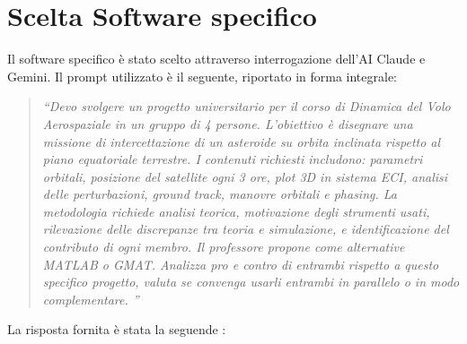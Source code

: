\documentclass[12pt, a4paper]{article}
\begin{document}
\section{Scelta Software specifico}
Il software specifico è stato scelto attraverso interrogazione dell'AI Claude e Gemini. Il prompt utilizzato è il seguente, riportato in forma integrale:  

\begin{quote}
    \itshape %
    \textsf{ %
        ``Devo svolgere un progetto universitario per il corso di Dinamica del Volo Aerospaziale in un gruppo di 4 persone. L'obiettivo è disegnare una missione di intercettazione di un asteroide su orbita inclinata rispetto al piano equatoriale terrestre. I contenuti richiesti includono: parametri orbitali, posizione del satellite ogni 3 ore, plot 3D in sistema ECI, analisi delle perturbazioni, ground track, manovre orbitali e phasing. La metodologia richiede analisi teorica, motivazione degli strumenti usati, rilevazione delle discrepanze tra teoria e simulazione, e identificazione del contributo di ogni membro. Il professore propone come alternative MATLAB o GMAT. Analizza pro e contro di entrambi rispetto a questo specifico progetto, valuta se convenga usarli entrambi in parallelo o in modo complementare. ''
    }
\end{quote}

La risposta fornita è stata la seguende :
\end{document}
